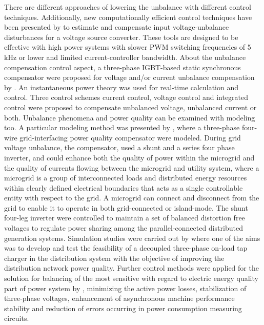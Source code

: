 There are different approaches of lowering the unbalance with different control techniques. Additionally, new computationally efficient control techniques have been presented by \cite{lee2009new} to estimate and compensate input voltage-unbalance disturbances for a voltage source converter. These tools are designed to be effective with high power systems with slower PWM switching frequencies of 5 kHz or lower and limited current-controller bandwidth. About the unbalance compensation control aspect, a three-phase IGBT-based static synchronous compensator were proposed for voltage and/or current unbalance compensation by \cite{xu2010voltage}. An instantaneous power theory was used for real-time calculation and control. Three control schemes current control, voltage control and integrated control were proposed to compensate unbalanced voltage, unbalanced current or both. Unbalance phenomena and power quality can be examined with modeling too. A particular modeling method was presented by \cite{li2005microgrid}, where a three-phase four-wire grid-interfacing power quality compensator were modeled. During grid voltage unbalance, the compensator, used a shunt and a series four phase inverter, and could enhance both the quality of power within the microgrid and the quality of currents flowing between the microgrid and utility system, where a microgrid is a group of interconnected loads and distributed energy resources within clearly defined electrical boundaries that acts as a single controllable entity with respect to the grid. A microgrid can connect and disconnect from the grid to enable it to operate in both grid-connected or island-mode. The shunt four-leg inverter were controlled to maintain a set of balanced distortion free voltages to regulate power sharing among the parallel-connected distributed generation systems. Simulation studies were carried out by \cite{Hu2016264} where one of the aims was to develop and test the feasibility of a decoupled three-phase on-load tap charger in the distribution system with the objective of improving the distribution network power quality. Further control methods were applied for the solution for balancing of the most sensitive with regard to electric energy quality part of power system by \cite{uimethod},  minimizing the active power losses, stabilization of three-phase voltages, enhancement of asynchronous machine performance stability and reduction of errors occurring in power consumption measuring circuits.\\

